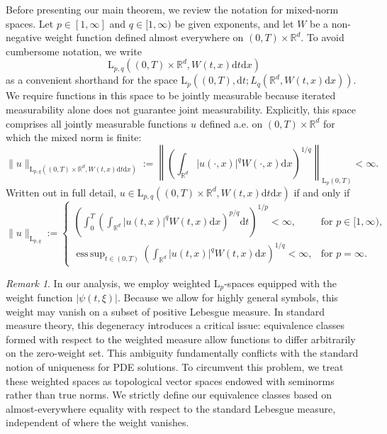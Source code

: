 \documentclass[11pt,reqno]{amsart}
\theoremstyle{definition}
\theoremstyle{remark}
\newtheorem{rem}[thm]{Remark}
\newcommand\bR{\mathbb{R}}
\numberwithin{equation}{section}
\begin{document}
Before presenting our main theorem, we review the notation for mixed-norm spaces. 
Let $p \in [1,\infty]$ and $q \in [1,\infty)$ be given exponents, and let $W$ be a non-negative weight function defined almost everywhere on $(0,T) \times \mathbb{R}^d$.
To avoid cumbersome notation, we write
$$
\mathrm{L}_{p,q}\left( (0,T) \times \bR^d,   W(t,x) \mathrm{d}t   \mathrm{d}x \right)
$$ 
as a convenient shorthand for the space $\mathrm{L}_{p}\left( (0,T), \mathrm{d}t ; L_q \left(\mathbb{R}^d, W(t,x)\mathrm{d}x \right)\right)$. 
We require functions in this space to be jointly measurable because iterated measurability alone does not guarantee joint measurability.
Explicitly, this space comprises all jointly measurable functions $u$ defined a.e. on $(0,T) \times \mathbb{R}^d$ for which the mixed norm is finite:
\[
\|u\|_{\mathrm{L}_{p,q}\left( (0,T) \times \mathbb{R}^d, W(t,x)\mathrm{d}t \mathrm{d}x \right)} := \left\| \left(\int_{\mathbb{R}^d} |u(\cdot,x)|^q W(\cdot,x) \mathrm{d}x \right)^{1/q} \right\|_{\mathrm{L}_p(0,T)} < \infty.
\]
Written out in full detail, $u \in \mathrm{L}_{p,q}\left( (0,T) \times \mathbb{R}^d, W(t,x)\mathrm{d}t \mathrm{d}x \right)$ if and only if
$$
\|u\|_{ \mathrm{L}_{p,q} } := 
\begin{cases}
\left(\int_{0}^{T} \left(\int_{\mathbb{R}^d} |u(t,x)|^q W(t,x) \mathrm{d}x \right)^{p/q} \mathrm{d}t \right)^{1/p} < \infty, & \text{for } p \in [1,\infty), \\
\mathop{\mathrm{ess\,sup}}_{t \in (0,T)} \left(\int_{\mathbb{R}^d} |u(t,x)|^q W(t,x) \mathrm{d}x \right)^{1/q} < \infty, & \text{for } p = \infty.
\end{cases}
$$





\begin{rem}
In our analysis, we employ weighted $\mathrm{L}_p$-spaces equipped with the weight function $|\psi(t,\xi)|$. 
Because we allow for highly general symbols, this weight may vanish on a subset of positive Lebesgue measure. 
In standard measure theory, this degeneracy introduces a critical issue: equivalence classes formed with respect to the weighted measure allow functions to differ arbitrarily on the zero-weight set. 
This ambiguity fundamentally conflicts with the standard notion of uniqueness for PDE solutions.
To circumvent this problem, we treat these weighted spaces as topological vector spaces endowed with seminorms rather than true norms. 
We strictly define our equivalence classes based on almost-everywhere equality with respect to the standard Lebesgue measure, independent of where the weight vanishes. 
\end{rem}
\end{document}

